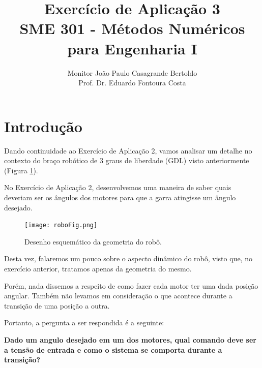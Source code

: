 \documentclass[12pt,a4paper,english,brazil]{article}
\begin{document}
\title{ Exercício de Aplicação 3 \\ 
        SME 301 -  Métodos Numéricos para Engenharia I }
\date{\vspace{-5ex}}
\author{ Monitor João Paulo Casagrande Bertoldo \\
         Prof. Dr. Eduardo Fontoura Costa }
\maketitle
\vspace{15pt}

\section{Introdução}\label{sec-intro}

Dando continuidade ao Exercício de Aplicação 2, vamos analisar um detalhe no contexto do braço robótico de 3 graus de liberdade (GDL) visto anteriormente (Figura \ref{fig:robo}). \

No Exercício de Aplicação 2, desenvolvemos uma maneira de saber quais deveriam ser os ângulos dos motores para que a garra atingisse um ângulo desejado. 

\begin{figure}[H]
\centering
\texttt{[image: roboFig.png]}
\caption{\label{fig:robo}Desenho esquemático da geometria do robô.}
\end{figure}

Desta vez, falaremos um pouco sobre o aspecto dinâmico do robô, visto que, no exercício anterior, tratamos apenas da geometria do mesmo. \

Porém, nada dissemos a respeito de como fazer cada motor ter uma dada posição angular. Também não levamos em consideração o que acontece durante a transição de uma posição a outra. \

Portanto, a pergunta a ser respondida é a seguinte:

\begin{center} \begin{large}
\textbf{Dado um angulo desejado em um dos motores, qual comando deve ser a tensão de entrada e como o sistema se comporta durante a transição?}
\end{large} \end{center}

\end{document}
